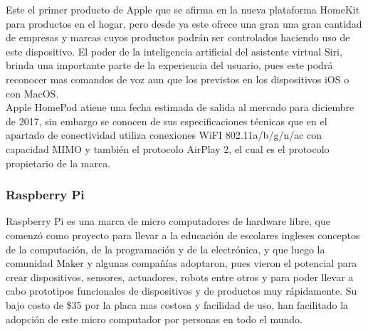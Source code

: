 Este el primer producto de Apple que se afirma en la nueva plataforma HomeKit para productos en el hogar, pero desde ya este ofrece una gran una gran cantidad de empresas y marcas cuyos productos podrán ser controlados haciendo uso de este dispositivo. El poder de la inteligencia artificial del asistente virtual Siri, brinda una importante parte de la experiencia del usuario, pues este podrá reconocer mas comandos de voz aun que los previstos en los dispositivos iOS o con MacOS.\\

Apple HomePod atiene una fecha estimada de salida al mercado para diciembre de 2017, sin embargo se conocen de sus especificaciones técnicas que en el apartado de conectividad utiliza conexiones WiFI 802.11a/b/g/n/ac con capacidad MIMO y también el protocolo  AirPlay 2, el cual es el protocolo propietario de la marca. 

\subsubsection{Raspberry Pi}
Raspberry Pi es una marca de micro computadores de hardware libre, que comenzó como proyecto para llevar a la educación  de escolares ingleses conceptos de la computación, de la programación y de la electrónica, y que luego la comunidad Maker y algunas compañías adoptaron, pues vieron el potencial para crear dispositivos, sensores, actuadores, robots entre otros y para poder llevar a cabo prototipos funcionales de dispositivos y de productos muy rápidamente. Su bajo costo de \$35 por la placa mas costosa y facilidad de uso, han facilitado la adopción de este micro computador por personas en todo el mundo.\\

